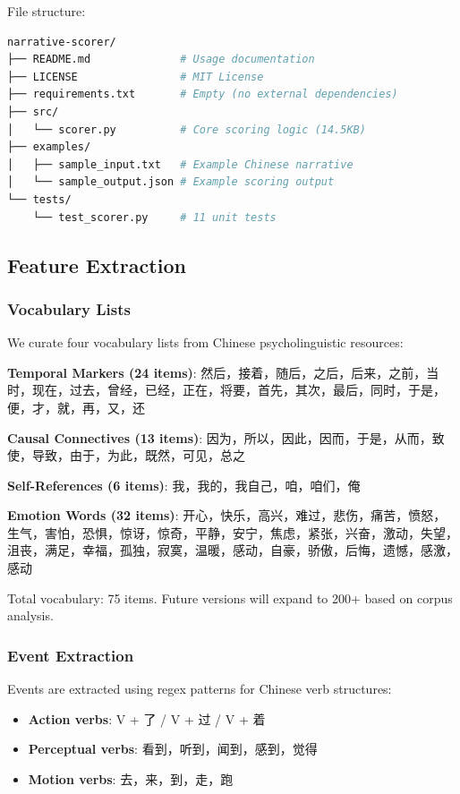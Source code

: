\documentclass{article}
\begin{document}
File structure:
\begin{lstlisting}[language=bash, caption={Narrative Scorer Repository Structure}]
narrative-scorer/
├── README.md              # Usage documentation
├── LICENSE                # MIT License
├── requirements.txt       # Empty (no external dependencies)
├── src/
│   └── scorer.py          # Core scoring logic (14.5KB)
├── examples/
│   ├── sample_input.txt   # Example Chinese narrative
│   └── sample_output.json # Example scoring output
└── tests/
    └── test_scorer.py     # 11 unit tests
\end{lstlisting}

\subsection{Feature Extraction}

\subsubsection{Vocabulary Lists}

We curate four vocabulary lists from Chinese psycholinguistic resources:

\textbf{Temporal Markers (24 items)}: 然后，接着，随后，之后，后来，之前，当时，现在，过去，曾经，已经，正在，将要，首先，其次，最后，同时，于是，便，才，就，再，又，还

\textbf{Causal Connectives (13 items)}: 因为，所以，因此，因而，于是，从而，致使，导致，由于，为此，既然，可见，总之

\textbf{Self-References (6 items)}: 我，我的，我自己，咱，咱们，俺

\textbf{Emotion Words (32 items)}: 开心，快乐，高兴，难过，悲伤，痛苦，愤怒，生气，害怕，恐惧，惊讶，惊奇，平静，安宁，焦虑，紧张，兴奋，激动，失望，沮丧，满足，幸福，孤独，寂寞，温暖，感动，自豪，骄傲，后悔，遗憾，感激，感动

Total vocabulary: 75 items. Future versions will expand to 200+ based on corpus analysis.

\subsubsection{Event Extraction}

Events are extracted using regex patterns for Chinese verb structures:
\begin{itemize}
    \item \textbf{Action verbs}: V + 了 / V + 过 / V + 着
    \item \textbf{Perceptual verbs}: 看到，听到，闻到，感到，觉得
    \item \textbf{Motion verbs}: 去，来，到，走，跑
\end{itemize}
\end{document}
